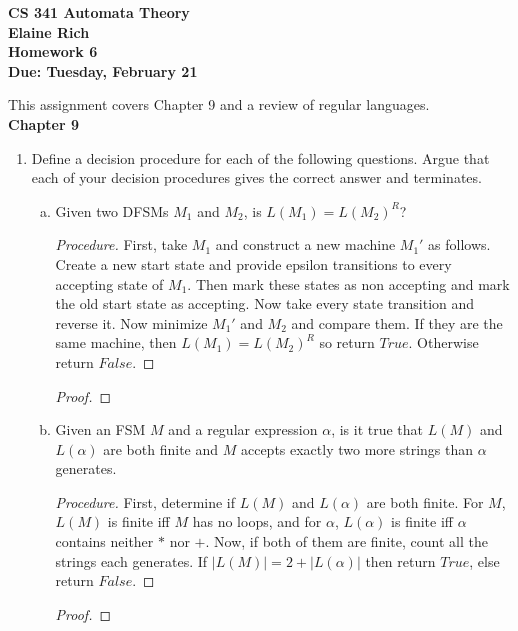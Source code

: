 \documentclass[10pt]{article}
\newcommand{\card}[1]{\left| #1 \right|}
\begin{document}
\begin{center}
\textbf{
CS 341 Automata Theory \\
Elaine Rich \\
Homework 6 \\
Due: Tuesday, February 21}\\
\end{center}
\noindent
This assignment covers Chapter 9 and a review of regular languages. \\

\noindent
\textbf{Chapter 9}
\begin{enumerate}[1)]

\item
Define a decision procedure for each of the following questions.  Argue that each of your decision procedures 
gives the correct answer and terminates.
\begin{enumerate}[a)]
\item
Given two DFSMs $M_1$ and $M_2$, is $L(M_1) = L(M_2)^R$?
\begin{proof}[Procedure]
First, take $M_1$ and construct a new machine $M_1'$ as follows.  Create a new start state and provide epsilon transitions to every accepting state of $M_1$.  Then mark these states as non accepting and mark the old start state as accepting.  Now take every state transition and reverse it.  Now minimize $M_1'$ and $M_2$ and compare them.  If they are the same machine, then $L(M_1) = L(M_2)^R$ so return $True$.  Otherwise return $False$.
\end{proof}
\begin{proof}[Proof]
\end{proof}

\item
Given an FSM $M$ and a regular expression $\alpha$, is it true that $L(M)$ and $L(\alpha)$ are both finite and $M$ accepts exactly two more strings than $\alpha$ generates.
\begin{proof}[Procedure]
First, determine if $L(M)$ and $L(\alpha)$ are both finite.  For $M$, $L(M)$ is finite iff $M$ has no loops, and for $\alpha$, $L(\alpha)$ is finite iff $\alpha$ contains neither $*$ nor $+$.  Now, if both of them are finite, count all the strings each generates.  If $\card{L(M)} = 2 + \card{L(\alpha)}$ then return $True$, else return $False$.
\end{proof}
\begin{proof}[Proof]
\end{proof}
\end{enumerate}
\end{enumerate}
\end{document}
